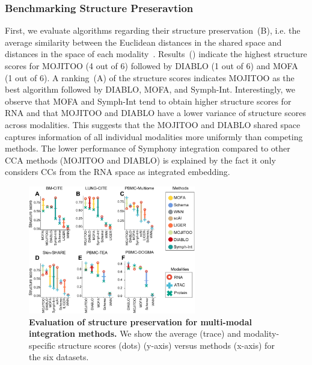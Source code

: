 \subsubsection{Benchmarking Structure Preseravtion}
First, we evaluate algorithms regarding their structure preservation~(B), i.e. the average similarity between the Euclidean distances in the shared space and distances in the space of each modality~\citep{jain2021multimap}. Results~() indicate the highest structure scores for MOJITOO (4 out of 6) followed by DIABLO (1 out of 6) and MOFA (1 out of 6). A ranking~(A) of the structure scores indicates MOJITOO as the best algorithm followed by DIABLO, MOFA, and Symph-Int. Interestingly, we observe that MOFA and Symph-Int tend to obtain higher structure scores for RNA and that MOJITOO and DIABLO have a lower variance of structure scores across modalities. This suggests that the MOJITOO and DIABLO shared space captures information of all individual modalities more uniformly than competing methods. The lower performance of Symphony integration compared to other CCA methods (MOJITOO and DIABLO) is explained by the fact it only considers CCs from the RNA space as integrated embedding.
\begin{figure}[!ht]
	\centering
	\includegraphics[width=0.65\textwidth]{structure/fig}
	\vspace{0.1cm}
	\caption[Evaluation of structure preservation for multi-modal integration methods.]{
	\textbf{Evaluation of structure preservation for multi-modal integration methods.}  We show the average (trace) and modality-specific structure scores (dots) (y-axis) versus methods (x-axis) for the six datasets.}
	\label{fig:structure}
\end{figure}


